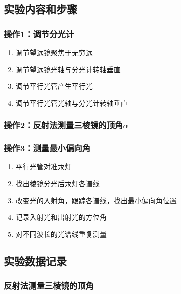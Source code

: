 \documentclass[dvipsnames, svgnames,a4paper,11pt]{article}
\newcommand{\recordblank}[1]{\par\vspace*{#1}\par}
\begin{document}

\subsection{实验内容和步骤}

\subsubsection{操作1：调节分光计}
\begin{enumerate}
	\item 调节望远镜聚焦于无穷远
	\item 调节望远镜光轴与分光计转轴垂直
	\item 调节平行光管产生平行光
	\item 调节平行光管光轴与分光计转轴垂直
\end{enumerate}

\subsubsection{操作2：反射法测量三棱镜的顶角$\alpha$}
\recordblank{5.0cm}
\subsubsection{操作3：测量最小偏向角}
\begin{enumerate}
	\item 平行光管对准汞灯
	\item 找出棱镜分光后汞灯各谱线
	\item 改变光的入射角，跟踪各谱线，找出最小偏向角位置
	\item 记录入射光和出射光的方位角
	\item 对不同波长的光谱线重复测量
\end{enumerate}

\subsection{实验数据记录}

\subsubsection{反射法测量三棱镜的顶角}
\recordblank{7.3cm}
\end{document}
